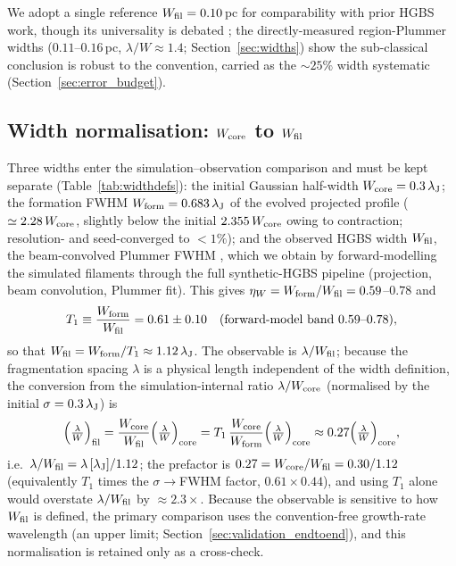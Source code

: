 \documentclass[usenatbib,twoside,twocolumn]{mnras}
\begin{document}
We adopt a single reference $W_{\rm fil}=0.10$\,pc for comparability with prior HGBS work, though its universality is debated \citep{Panopoulou2017,Panopoulou2022}; the directly-measured region-Plummer widths ($0.11$--$0.16$\,pc, $\lambda/W\approx1.4$; Section~\ref{sec:widths}) show the sub-classical conclusion is robust to the convention, carried as the $\sim25\%$ width systematic (Section~\ref{sec:error_budget}).

\subsection{Width normalisation: $W_{\rm core}$ to $W_{\rm fil}$}
\label{sec:width_correction}
Three widths enter the simulation--observation comparison and must be kept separate (Table~\ref{tab:widthdefs}): the initial Gaussian half-width $W_{\rm core}=0.3\,\lambda_{\rm J}$; the formation FWHM $W_{\rm form}=0.683\,\lambda_{\rm J}$ of the evolved projected profile ($\simeq2.28\,W_{\rm core}$, slightly below the initial $2.355\,W_{\rm core}$ owing to contraction; resolution- and seed-converged to $<1\%$); and the observed HGBS width $W_{\rm fil}$, the beam-convolved Plummer FWHM \citep{Arzoumanian2019}, which we obtain by forward-modelling the simulated filaments through the full synthetic-HGBS pipeline (projection, beam convolution, Plummer fit). This gives $\eta_W=W_{\rm form}/W_{\rm fil}=0.59$--$0.78$ and
\begin{equation}
T_1 \equiv \frac{W_{\rm form}}{W_{\rm fil}} = 0.61 \pm 0.10 \quad (\text{forward-model band } 0.59\text{--}0.78),
\label{eq:t1_correction}
\end{equation}
so that $W_{\rm fil}=W_{\rm form}/T_1\approx1.12\,\lambda_{\rm J}$. The observable is $\lambda/W_{\rm fil}$; because the fragmentation spacing $\lambda$ is a physical length independent of the width definition, the conversion from the simulation-internal ratio $\lambda/W_{\rm core}$ (normalised by the initial $\sigma=0.3\,\lambda_{\rm J}$) is
\begin{equation}
\Big(\tfrac{\lambda}{W}\Big)_{\rm fil} = \frac{W_{\rm core}}{W_{\rm fil}}\Big(\tfrac{\lambda}{W}\Big)_{\rm core} = T_1\,\frac{W_{\rm core}}{W_{\rm form}}\Big(\tfrac{\lambda}{W}\Big)_{\rm core} \approx 0.27\Big(\tfrac{\lambda}{W}\Big)_{\rm core},
\label{eq:t1_apply}
\end{equation}
i.e.\ $\lambda/W_{\rm fil}=\lambda\,[\lambda_{\rm J}]/1.12$; the prefactor is $0.27=W_{\rm core}/W_{\rm fil}=0.30/1.12$ (equivalently $T_1$ times the $\sigma\!\to\!$FWHM factor, $0.61\times0.44$), and using $T_1$ alone would overstate $\lambda/W_{\rm fil}$ by $\approx2.3\times$. Because the observable is sensitive to how $W_{\rm fil}$ is defined, the primary comparison uses the convention-free growth-rate wavelength (an upper limit; Section~\ref{sec:validation_endtoend}), and this normalisation is retained only as a cross-check.
\end{document}
